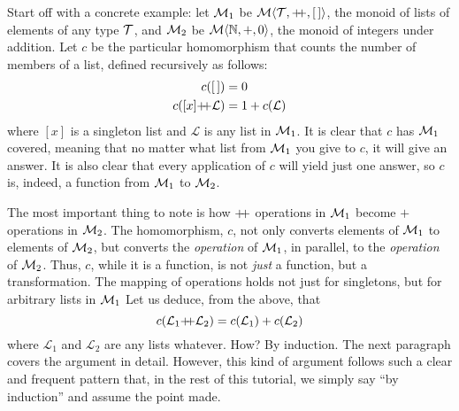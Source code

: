 Start off with a concrete example: let $\mathcal{M}_{1}$ be $\Mon{\T}{\pp}{\emptylist}$, the monoid of lists of elements of any type $\mathcal{T}$, and $\mathcal{M}_{2}$ be $\mathcal{M}\langle{\mathbb{N}},{+},{0}\rangle$, the monoid of integers under addition. Let $c$ be the particular homomorphism that counts the number of members of a list, defined recursively as follows:
\begin{align*}
  c(\emptylist)        & = 0 \\
  c([x]\pp\mathcal{L}) & = 1 + c(\mathcal{L})
\end{align*}
where $[x]$ is a singleton list and $\mathcal{L}$ is any list in $\mathcal{M}_{1}$. It is clear that $c$ has $\mathcal{M}_{1}$ covered, meaning that no matter what list from $\mathcal{M}_{1}$ you give to $c$, it will give an answer. It is also clear that every application of $c$ will yield just one answer, so $c$ is, indeed, a function from $\mathcal{M}_{1}$ to $\mathcal{M}_{2}$. 

The most important thing to note is how $\pp$ operations in $\mathcal{M}_{1}$ become $+$ operations in $\mathcal{M}_{2}$. The homomorphism, $c$, not only converts elements of $\mathcal{M}_{1}$ to elements of $\mathcal{M}_{2}$, but converts the \emph{operation} of $\mathcal{M}_{1}$, in parallel, to the \emph{operation} of $\mathcal{M}_{2}$. Thus, $c$, while it is a function, is not \emph{just} a function, but a transformation. The mapping of operations holds not just for singletons, but for arbitrary lists in $\mathcal{M}_{1}$ Let us deduce, from the above, that 
\begin{equation}
  c(\mathcal{L}_{1}\pp\mathcal{L}_{2})=c(\mathcal{L}_{1})+c(\mathcal{L}_{2})
  \label{eqn:inducl}
\end{equation}
where $\mathcal{L}_{1}$ and $\mathcal{L}_{2}$ are any lists whatever. How? By induction. The next paragraph covers the argument in detail. However, this kind of argument follows such a clear and frequent pattern that, in the rest of this tutorial, we simply say ``by induction'' and assume the point made. 


